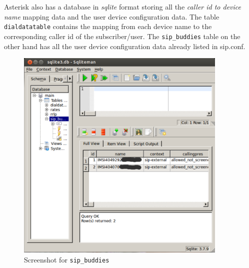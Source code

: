 Asterisk also has a database in \textsl{sqlite} format storing all the 
\emph{caller id to device name} mapping data and the user device configuration
data. The table \texttt{dialdatatable} contains the mapping from each device
name to the corresponding caller id of the subscriber/user. The
\texttt{sip\_buddies} table on the other hand has all the user device 
configuration data already listed in \textsf{sip.conf}.

\begin{figure}
  \centering
    \includegraphics[width=0.9\textwidth]{../images/sipbuddies}
  \caption[Screenshot - sip\_buddies]{Screenshot for \texttt{sip\_buddies}}
  \label{sipbuddies}
\end{figure}


